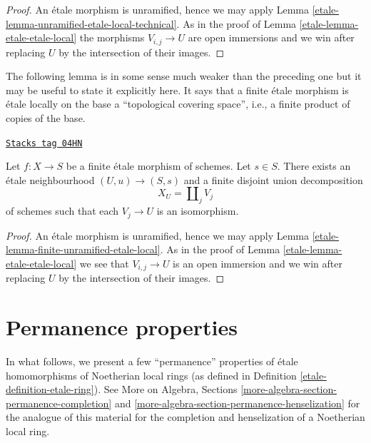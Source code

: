 \begin{proof}

An \'etale morphism is unramified, hence we may apply
Lemma \ref{etale-lemma-unramified-etale-local-technical}.
As in the proof of
Lemma \ref{etale-lemma-etale-etale-local}
the morphisms $V_{i, j} \to U$ are open immersions and
we win after replacing $U$ by the intersection of their
images.
\end{proof}

The following lemma is in some sense much weaker than the preceding one
but it may be useful to state it explicitly here. It says that a finite
\'etale morphism is \'etale locally on the base a
``topological covering space'', i.e., a finite product of copies of the base.

\begin{lemma}
\label{etale-lemma-finite-etale-etale-local}
\href{https://stacks.math.columbia.edu/tag/04HN}{\texttt{Stacks tag 04HN}}

Let $f : X \to S$ be a finite \'etale morphism of schemes.
Let $s \in S$. There exists an \'etale neighbourhood $(U, u) \to (S, s)$
and a finite disjoint union decomposition
$$
X_U = \coprod\nolimits_j V_j
$$
of schemes such that each $V_j \to U$ is an isomorphism.
\end{lemma}

\begin{proof}

An \'etale morphism is unramified, hence we may apply
Lemma \ref{etale-lemma-finite-unramified-etale-local}.
As in the proof of
Lemma \ref{etale-lemma-etale-etale-local}
we see that $V_{i, j} \to U$ is an open immersion and we win
after replacing $U$ by the intersection of their images.
\end{proof}

\section{Permanence properties}
\label{etale-section-properties-permanence}
In what follows, we present a few ``permanence''
properties of \'etale homomorphisms of Noetherian local rings
(as defined in Definition \ref{etale-definition-etale-ring}). See
More on Algebra, Sections \ref{more-algebra-section-permanence-completion} and
\ref{more-algebra-section-permanence-henselization}
for the analogue of this material for the completion and
henselization of a Noetherian local ring.

